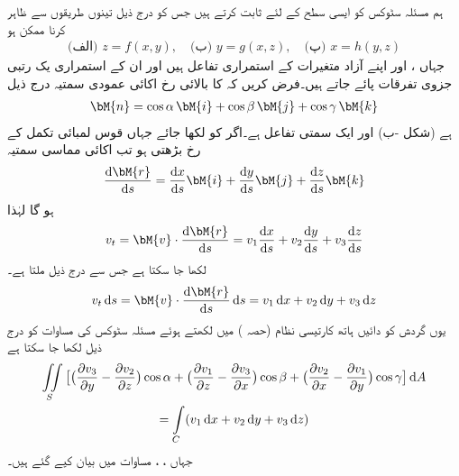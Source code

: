 ہم مسئلہ سٹوکس کو ایسی سطح  کے لئے ثابت کرتے ہیں جس کو درج ذیل تینوں طریقوں سے ظاہر کرنا ممکن ہو
\begin{align}\label{مساوات_خطی_تکمل_سٹوکس_ب}
\text{(الف)}\,\,z=f(x,y),\quad \text{(ب)}\,\,y=g(x,z),\quad \text{(پ)}\,\,x=h(y,z)
\end{align}
جہاں ،  اور  اپنے آزاد متغیرات کے استمراری تفاعل ہیں اور ان کے استمراری یک رتبی جزوی تفرقات پائے جاتے ہیں۔فرض کریں کہ  کا بالائی رخ اکائی عمودی سمتیہ  درج ذیل
\begin{align}\label{مساوات_خطی_تکمل_سٹوکس_پ}
\bM{n}=\cos \alpha \,\bM{i}+\cos \beta \,\bM{j}+\cos \gamma \,\bM{k}
\end{align}
ہے (شکل -ب) اور  ایک سمتی تفاعل ہے۔اگر  کو  لکھا جائے جہاں قوس لمبائی  تکمل کے رخ بڑھتی ہو تب اکائی مماسی سمتیہ
\begin{align*}
\frac{\dif \bM{r}}{\dif s}=\frac{\dif x}{\dif s}\bM{i}+\frac{\dif y}{\dif s}\bM{j}+\frac{\dif z}{\dif s}\bM{k}
\end{align*}
ہو گا لہٰذا
\begin{align*}
v_t=\bM{v}\cdot \frac{\dif \bM{r}}{\dif s}=v_1\frac{\dif x}{\dif s}+v_2\frac{\dif y}{\dif s}+v_3\frac{\dif z}{\dif s}
\end{align*}
لکھا جا سکتا ہے جس سے درج ذیل ملتا ہے۔
\begin{align*}
v_t \dif s=\bM{v}\cdot \frac{\dif \bM{r}}{\dif s}\dif s=v_1\dif x+v_2\dif y+v_3\dif z
\end{align*}
یوں  گردش کو دائیں ہاتھ کارتیسی نظام (حصہ ) میں لکھتے ہوئے مسئلہ سٹوکس کی مساوات کو درج ذیل لکھا جا سکتا ہے
\begin{multline}\label{مساوات_خطی_تکمل_سٹوکس_ت}
\iint\limits_S\big[\big(\frac{\partial v_3}{\partial y}-\frac{\partial v_2}{\partial z}\big)\cos \alpha+\big(\frac{\partial v_1}{\partial z}-\frac{\partial v_3}{\partial x}\big)\cos \beta+\big(\frac{\partial v_2}{\partial x}-\frac{\partial v_1}{\partial y}\big)\cos \gamma\big]\dif A\\
=\int\limits_C (v_1\dif x+v_2\dif y+v_3\dif z)
\end{multline} 
جہاں ، ،  مساوات  میں بیان کیے گئے ہیں۔

